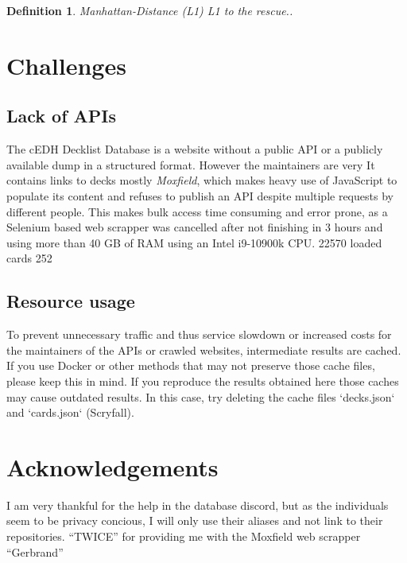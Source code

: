 \documentclass[a4]{article}
\newtheorem{definition}{Definition}
\begin{document}
\begin{definition}{Manhattan-Distance (L1)}
L1 to the rescue..
\end{definition}

\section{Challenges}
\subsection{Lack of APIs}
The cEDH Decklist Database is a website without a public API or a publicly available dump in a structured format.
However the maintainers are very 
It contains links to decks mostly \emph{Moxfield}, which makes heavy use of JavaScript to populate its content and refuses to publish an API despite multiple requests by different people.
This makes bulk access time consuming and error prone, as a Selenium based web scrapper was cancelled after not finishing in 3 hours and using more than 40 GB of RAM using an Intel i9-10900k CPU.\footnotemark{}
22570 loaded cards
252
\subsection{Resource usage}
To prevent unnecessary traffic and thus service slowdown or increased costs for the maintainers of the APIs or crawled websites, intermediate results are cached.
If you use Docker or other methods that may not preserve those cache files, please keep this in mind.
If you reproduce the results obtained here those caches may cause outdated results.
In this case, try deleting the cache files `decks.json` and `cards.json` (Scryfall).

\section{Acknowledgements}
I am very thankful for the help in the database discord, but as the individuals seem to be privacy concious, I will only use their aliases and not link to their repositories.
\enquote{TWICE} for providing me with the Moxfield web scrapper
\enquote{Gerbrand}
\end{document}
